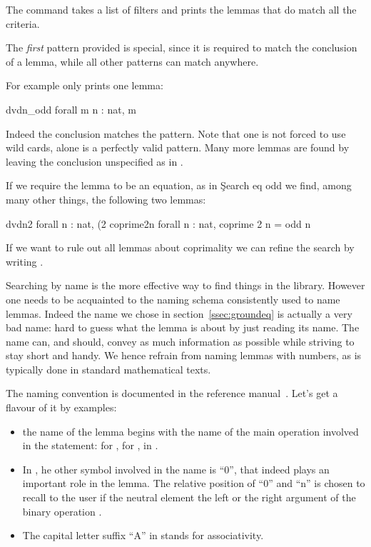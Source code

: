 The  command takes a list of filters and prints the lemmas
that do match all the criteria.

The \emph{first} pattern provided is special, since it is required to match
the conclusion of a lemma, while all other patterns can match anywhere.

For example  only prints one lemma:

\begin{coq}{}{}
dvdn_odd  forall m n : nat, m %
\end{coq}
Indeed the conclusion matches the pattern.  Note that one is not forced to
use wild cards,  alone is a perfectly valid pattern.  Many more
lemmas are found by leaving the conclusion unspecified as in .

If we require the lemma to be an equation, as in \c{Search eq odd} we find,
among many other things, the following two lemmas:

\begin{coqout}{}{}
dvdn2  forall n : nat, (2 %
coprime2n  forall n : nat, coprime 2 n = odd n
\end{coqout}
If we want to rule out all lemmas about coprimality we can refine the
search by writing .


Searching by name is the more effective way to find things in the
\mcbMC{} library.  However one needs to be acquainted to the naming schema
consistently used to name lemmas.  Indeed the name  we
chose in section~\ref{ssec:groundeq} is actually a very bad name:
hard to guess what the lemma is about by just reading its name.
The name can, and should, convey as much information as possible while
striving to stay short and handy.  We hence refrain from naming lemmas with
numbers, as is typically done in standard mathematical texts.

The naming convention is documented in the reference
manual~\cite[Section 11]{ssrman}.
Let's get a flavour of it by examples:

\begin{itemize}
\item the name of the lemma begins with the name of the main operation
  involved in the statement:  for ,  for
  ,  in .
\item In , he other symbol involved in the name is ``0'',
that indeed plays an important role in the lemma.  The relative position
of ``0'' and ``n'' is chosen to recall to the user if the neutral element
 the left or the right argument of the binary operation .
\item The capital letter suffix ``A'' in  stands for associativity.
\end{itemize}

